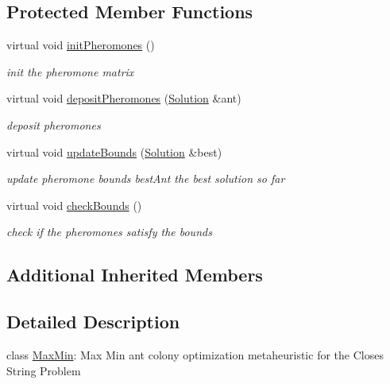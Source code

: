 \subsection*{Protected Member Functions}
\begin{DoxyCompactItemize}
\item 
virtual void \hyperlink{classMaxMin_a2d3a9fd991bc090d8b731c85f013edeb}{init\+Pheromones} ()\hypertarget{classMaxMin_a2d3a9fd991bc090d8b731c85f013edeb}{}\label{classMaxMin_a2d3a9fd991bc090d8b731c85f013edeb}

\begin{DoxyCompactList}\small\item\em init the pheromone matrix \end{DoxyCompactList}\item 
virtual void \hyperlink{classMaxMin_a0426957fa02c8bf28d527bb1ee1519d3}{deposit\+Pheromones} (\hyperlink{classSolution}{Solution} \&ant)
\begin{DoxyCompactList}\small\item\em deposit pheromones \end{DoxyCompactList}\item 
virtual void \hyperlink{classMaxMin_a6c9e927c48f3d91e2a84f2e4d2706b37}{update\+Bounds} (\hyperlink{classSolution}{Solution} \&best)\hypertarget{classMaxMin_a6c9e927c48f3d91e2a84f2e4d2706b37}{}\label{classMaxMin_a6c9e927c48f3d91e2a84f2e4d2706b37}

\begin{DoxyCompactList}\small\item\em update pheromone bounds  best\+Ant the best solution so far \end{DoxyCompactList}\item 
virtual void \hyperlink{classMaxMin_a67087a455729080bab2b12818a369241}{check\+Bounds} ()\hypertarget{classMaxMin_a67087a455729080bab2b12818a369241}{}\label{classMaxMin_a67087a455729080bab2b12818a369241}

\begin{DoxyCompactList}\small\item\em check if the pheromones satisfy the bounds \end{DoxyCompactList}\end{DoxyCompactItemize}
\subsection*{Additional Inherited Members}


\subsection{Detailed Description}
class \hyperlink{classMaxMin}{Max\+Min}\+: Max Min ant colony optimization metaheuristic for the Closes String Problem 

